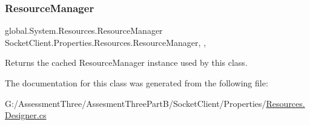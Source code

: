 \subsubsection{\texorpdfstring{Resource\+Manager}{ResourceManager}}
{\footnotesize\ttfamily global.\+System.\+Resources.\+Resource\+Manager Socket\+Client.\+Properties.\+Resources.\+Resource\+Manager\hspace{0.3cm}{\ttfamily [static]}, {\ttfamily [get]}, {\ttfamily [package]}}



Returns the cached Resource\+Manager instance used by this class. 



The documentation for this class was generated from the following file\+:\begin{DoxyCompactItemize}
\item 
G\+:/\+Assessment\+Three/\+Assesment\+Three\+Part\+B/\+Socket\+Client/\+Properties/\hyperlink{_socket_client_2_properties_2_resources_8_designer_8cs}{Resources.\+Designer.\+cs}\end{DoxyCompactItemize}
